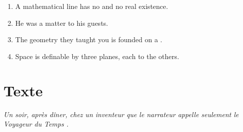 \documentclass{fiche}
\begin{document}

\begin{anglais}
\begin{enumerate}[label=\arabic*.,itemsep=2mm,leftmargin=*]
  \item A mathematical line has no  and no real existence.
  \item He was  a  matter to his guests.
  \item The geometry they taught you is founded on a .
  \item Space is definable by three planes, each  to the others.
\end{enumerate}
\end{anglais}

\newpage
\section{Texte}

\noindent\small\textit{Un soir, après dîner, chez un inventeur que le narrateur appelle
seulement \og le Voyageur du Temps \fg.}\normalsize
\end{document}
